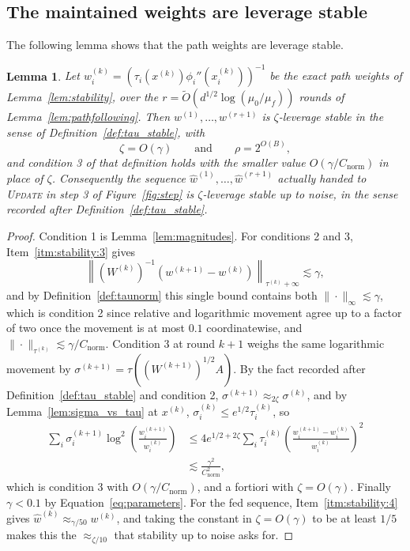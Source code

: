 \documentclass[11pt]{article}
\newtheorem{lemma}{Lemma}[section]
\renewcommand{\O}{\widetilde O}
\newcommand{\what}{\widehat{w}}
\newcommand{\Cnorm}{C_{\mathrm{norm}}}
\begin{document}
\subsection{The maintained weights are leverage stable}
\label{subsec:ipm_stable}

The following lemma shows that the path weights are leverage stable.

\begin{lemma}
\label{lem:ipm_is_stable}
Let $w^{(k)}_i = (\tau_i(x^{(k)}) \phi_i''(x^{(k)}_i))^{-1}$ be the exact path
weights of Lemma~\ref{lem:stability}, over the
$r = \O(d^{1/2} \log(\mu_0 / \mu_f))$ rounds of Lemma~\ref{lem:pathfollowing}.
Then $w^{(1)}, \ldots, w^{(r + 1)}$ is
$\zeta$-leverage stable in the sense of Definition~\ref{def:tau_stable}, with
\[
\zeta = O(\gamma)
\qquad\text{and}\qquad
\rho = 2^{O(B)},
\]
and condition 3 of that definition holds with the smaller value
$O(\gamma / \Cnorm)$ in place of
$\zeta$.
Consequently the sequence $\what^{(1)}, \ldots, \what^{(r + 1)}$ actually handed
to \textsc{Update} in step 3 of Figure~\ref{fig:step} is $\zeta$-leverage stable
up to noise, in the sense recorded after Definition~\ref{def:tau_stable}.
\end{lemma}

\begin{proof}
Condition 1 is Lemma~\ref{lem:magnitudes}.
For conditions 2 and 3, Item~\ref{itm:stability:3} gives
\[
\left\| (W^{(k)})^{-1}
\left( w^{(k + 1)} - w^{(k)} \right)
\right\|_{\tau^{(k)} + \infty}
\lesssim \gamma,
\]
and by Definition~\ref{def:taunorm} this single bound contains both
$\|\cdot\|_{\infty} \lesssim \gamma$, which is condition 2 since relative and
logarithmic movement agree up to a factor of two once the movement is at most
$0.1$ coordinatewise, and
$\|\cdot\|_{\tau^{(k)}} \lesssim \gamma / \Cnorm$.
Condition 3 at round $k + 1$ weighs the same logarithmic movement by
$\sigma^{(k + 1)} = \tau((W^{(k + 1)})^{1/2} A)$.
By the fact recorded after Definition~\ref{def:tau_stable} and condition 2,
$\sigma^{(k + 1)} \approx_{2 \zeta} \sigma^{(k)}$, and by
Lemma~\ref{lem:sigma_vs_tau} at $x^{(k)}$,
$\sigma^{(k)}_i \le e^{1/2} \tau^{(k)}_i$, so
\[
\begin{aligned}
\sum_i \sigma^{(k + 1)}_i
\log^{2}\left( \frac{w^{(k + 1)}_i}{w^{(k)}_i} \right)
&\le
4 e^{1/2 + 2 \zeta}
\sum_i \tau^{(k)}_i
\left( \frac{w^{(k + 1)}_i - w^{(k)}_i}{w^{(k)}_i} \right)^{2}
\\
&\lesssim
\frac{\gamma^{2}}{\Cnorm^{2}},
\end{aligned}
\]
which is condition 3 with $O(\gamma / \Cnorm)$, and a fortiori with
$\zeta = O(\gamma)$.
Finally $\gamma < 0.1$ by Equation~\eqref{eq:parameters}.
For the fed sequence, Item~\ref{itm:stability:4} gives
$\what^{(k)} \approx_{\gamma / 50} w^{(k)}$, and taking the constant in
$\zeta = O(\gamma)$ to be at least
$1/5$ makes this the
$\approx_{\zeta / 10}$ that stability up to noise asks for.
\end{proof}
\end{document}
